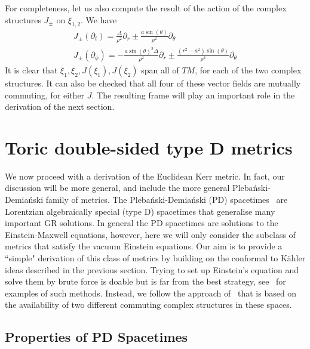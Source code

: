 \documentclass[10pt]{report}
\newcommand{\pleb}[0]{Pleba\'nski}
\newcommand{\demi}[0]{Demia\'nski}
\theoremstyle{definition}
\begin{document}
For completeness, let us also compute the result of the action of the complex structures $J_\pm$ on $\xi_{1,2}$. We have 
\begin{gather}
    J_\pm(\partial_t) = \frac{\Delta}{\rho^2}\partial_r \pm \frac{a \sin(\theta)}{\rho^2} \partial_\theta \\
    J_\pm(\partial_\phi) = -\frac{a \sin(\theta)^2\Delta}{\rho^2} \partial_r \pm \frac{(r^2-a^2)\sin(\theta)}{\rho^2} \partial_\theta
\end{gather}
It is clear that $\xi_1,\xi_2, J(\xi_1),J(\xi_2)$ span all of $TM$, for each of the two complex structures. It can also be checked that all four of these vector fields are mutually commuting, for either $J$. The resulting frame will play an important role in the derivation of the next section. 


\section{Toric double-sided type D metrics}\label{sec:DerivationOfTypeDSpacetimes}

We now proceed with a derivation of the Euclidean Kerr metric. In fact, our discussion will be more general, and include the more general \pleb{}-\demi{} family of metrics. 
The \pleb{}-\demi{} (PD) spacetimes~\cite{RotatingChargPleban1976,ANewLookAtTGriffi2005} are Lorentzian algebraically special (type D) spacetimes that generalise many
important GR solutions. In general the PD spacetimes are solutions to the Einstein-Maxwell equations, however, here we will only consider the subclass of metrics that satisfy the vacuum Einstein equations. Our aim is to provide a ``simple" derivation of this class of metrics by building on the conformal to K\"ahler ideas described in the previous section. 
Trying to set up Einstein's equation and solve them by brute force is doable but is far from the best strategy, see~\cite{TheMathematicaChandr1998, PhysicallyMotiBaines2022, APossibleIntuNikoli2012} for examples of such methods. Instead, we follow the approach of~\cite{Aposto2003,AmbitoricGeomeAposto2013} that is based on the availability of two different commuting complex structures in these spaces. 

\subsection{Properties of PD Spacetimes}
\end{document}

